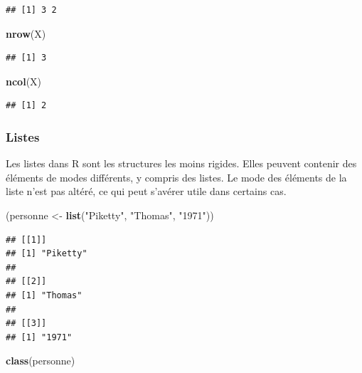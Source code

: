\documentclass[
  11pt,
]{book}
\newenvironment{Shaded}{\begin{snugshade}}{\end{snugshade}}
\newcommand{\KeywordTok}[1]{\textcolor[rgb]{0.13,0.29,0.53}{\textbf{#1}}}
\newcommand{\NormalTok}[1]{#1}
\newcommand{\StringTok}[1]{\textcolor[rgb]{0.31,0.60,0.02}{#1}}
\numberwithin{equation}{section}
\numberwithin{countremarque}{section}
\begin{document}
\begin{lstlisting}
## [1] 3 2
\end{lstlisting}

\begin{Shaded}
\begin{Highlighting}[]
\KeywordTok{nrow}\NormalTok{(X)}
\end{Highlighting}
\end{Shaded}

\begin{lstlisting}
## [1] 3
\end{lstlisting}

\begin{Shaded}
\begin{Highlighting}[]
\KeywordTok{ncol}\NormalTok{(X)}
\end{Highlighting}
\end{Shaded}

\begin{lstlisting}
## [1] 2
\end{lstlisting}

\hypertarget{listes}{%
\subsubsection{Listes}\label{listes}}

Les listes dans R sont les structures les moins rigides. Elles peuvent contenir des éléments de modes différents, y compris des listes. Le mode des éléments de la liste n'est pas altéré, ce qui peut s'avérer utile dans certains cas.

\begin{Shaded}
\begin{Highlighting}[]
\NormalTok{(personne \textless{}{-}}\StringTok{ }\KeywordTok{list}\NormalTok{(}\StringTok{"Piketty"}\NormalTok{, }\StringTok{"Thomas"}\NormalTok{, }\StringTok{"1971"}\NormalTok{))}
\end{Highlighting}
\end{Shaded}

\begin{lstlisting}
## [[1]]
## [1] "Piketty"
## 
## [[2]]
## [1] "Thomas"
## 
## [[3]]
## [1] "1971"
\end{lstlisting}

\begin{Shaded}
\begin{Highlighting}[]
\KeywordTok{class}\NormalTok{(personne)}
\end{Highlighting}
\end{Shaded}
\end{document}
